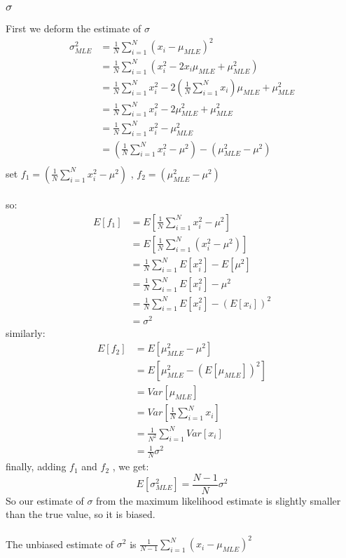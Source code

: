 \documentclass{report}
\begin{document}
\subsubsection{$\sigma$}
First we deform the estimate of $\sigma$
$$
\begin{aligned}
\sigma_{MLE}^2
&=\frac{1}{N} \sum_{i=1} ^N (x_i - \mu_{MLE})^2\\
&=\frac{1}{N} \sum_{i=1} ^N (x_i^2 - 2x_i\mu_{MLE} + \mu_{MLE}^2)\\
&=\frac{1}{N} \sum_{i=1}^N x_i^2 - 2(\frac{1}{N} \sum_{i=1} ^N x_i) \mu_{MLE} + \mu_{MLE}^2\\
&=\frac{1}{N} \sum_{i=1}^N x_i^2 - 2\mu_{MLE}^2 + \mu_{MLE}^2\\
&=\frac{1}{N} \sum_{i=1}^N x_i^2 - \mu_{MLE}^2\\
&=(\frac{1}{N} \sum_{i=1}^N x_i^2-\mu^2) - (\mu_{MLE}^2-\mu^2)\\
\end{aligned}
$$
set $f_1=(\frac{1}{N} \sum_{i=1}^N x_i^2-\mu^2)$ , $f_2=(\mu_{MLE}^2-\mu^2)$\\\\
so:
$$
\begin{aligned}
E[f_1]
&=E[\frac{1}{N} \sum_{i=1}^N x_i^2 - \mu^2]\\
&=E[\frac{1}{N} \sum_{i=1}^N (x_i^2 - \mu^2)]\\
&=\frac{1}{N} \sum_{i=1}^N E[x_i^2] - E[\mu^2]\\
&=\frac{1}{N} \sum_{i=1}^N E[x_i^2] - \mu^2\\
&=\frac{1}{N} \sum_{i=1}^N E[x_i^2] - (E[x_i])^2\\
&=\sigma^2
\end{aligned}
$$
similarly:
$$
\begin{aligned}
E[f_2]
&=E[\mu_{MLE}^2 - \mu^2]\\
&=E[\mu_{MLE}^2 - (E[\mu_{MLE}])^2]\\
&=Var[\mu_{MLE}]\\
&=Var[\frac{1}{N} \sum_{i=1} ^N x_i]\\
&=\frac{1}{N^2} \sum_{i=1} ^N Var[x_i]\\
&=\frac{1}{N} \sigma^2
\end{aligned}
$$
finally, adding $f_1$ and $f_2$ , we get:
$$
E[\sigma_{MLE}^2]=\frac{N-1}{N} \sigma^2
$$
So our estimate of $\sigma$ from the maximum likelihood estimate is slightly smaller than the true value, so it is biased.\\\\
The unbiased estimate of $\sigma^2$ is $\frac{1}{N-1}\sum_{i=1}^N (x_i-\mu_{MLE})^2$
\end{document}

